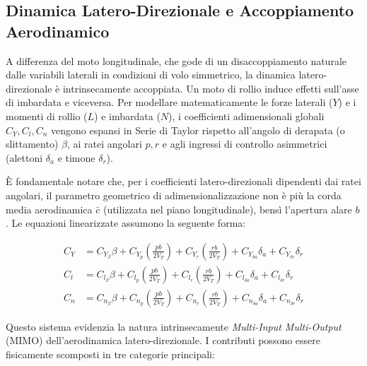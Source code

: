 \subsection{Dinamica Latero-Direzionale e Accoppiamento Aerodinamico}
\label{sec:derivate_latero_direzionali}

A differenza del moto longitudinale, che gode di un disaccoppiamento naturale dalle variabili laterali in condizioni di volo simmetrico, la dinamica latero-direzionale è intrinsecamente accoppiata. Un moto di rollio induce effetti sull'asse di imbardata e viceversa. Per modellare matematicamente le forze laterali ($Y$) e i momenti di rollio ($L$) e imbardata ($N$), i coefficienti adimensionali globali $C_Y, C_l, C_n$ vengono espansi in Serie di Taylor rispetto all'angolo di derapata (o slittamento) $\beta$, ai ratei angolari $p, r$ e agli ingressi di controllo asimmetrici (alettoni $\delta_a$ e timone $\delta_r$).

È fondamentale notare che, per i coefficienti latero-direzionali dipendenti dai ratei angolari, il parametro geometrico di adimensionalizzazione non è più la corda media aerodinamica $\bar{c}$ (utilizzata nel piano longitudinale), bensì l'apertura alare $b$. Le equazioni linearizzate assumono la seguente forma:

\begin{align}
	C_Y &= C_{Y_\beta} \beta + C_{Y_p} \left(\frac{p b}{2 V_T}\right) + C_{Y_r} \left(\frac{r b}{2 V_T}\right) + C_{Y_{\delta a}} \delta_a + C_{Y_{\delta r}} \delta_r \label{eq:Cy_exp} \\
	C_l &= C_{l_\beta} \beta + C_{l_p} \left(\frac{p b}{2 V_T}\right) + C_{l_r} \left(\frac{r b}{2 V_T}\right) + C_{l_{\delta a}} \delta_a + C_{l_{\delta r}} \delta_r \label{eq:Cl_exp} \\
	C_n &= C_{n_\beta} \beta + C_{n_p} \left(\frac{p b}{2 V_T}\right) + C_{n_r} \left(\frac{r b}{2 V_T}\right) + C_{n_{\delta a}} \delta_a + C_{n_{\delta r}} \delta_r \label{eq:Cn_exp}
\end{align}

Questo sistema evidenzia la natura intrinsecamente \textit{Multi-Input Multi-Output} (MIMO) dell'aerodinamica latero-direzionale. I contributi possono essere fisicamente scomposti in tre categorie principali:

